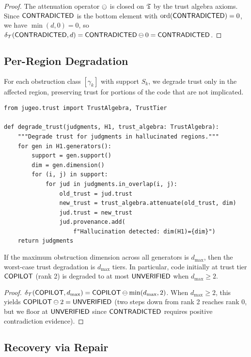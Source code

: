 \documentclass[11pt]{article}
\newcommand{\DegradeFn}{\delta_\trust}
\begin{document}
\begin{proof}
The attenuation operator $\ominus$ is closed on $\mathfrak{T}$ by the
trust algebra axioms.  Since $\mathsf{CONTRADICTED}$ is the bottom element with
$\mathrm{ord}(\mathsf{CONTRADICTED}) = 0$, we have $\min(d, 0) = 0$, so
$\DegradeFn(\Tcontra, d) = \Tcontra \tatten 0 = \Tcontra$.
\end{proof}


\subsection{Per-Region Degradation}

For each obstruction class $[\gamma_k]$ with support $S_k$, we
degrade trust only in the affected region, preserving trust for
portions of the code that are not implicated.

\begin{lstlisting}
from jugeo.trust import TrustAlgebra, TrustTier

def degrade_trust(judgments, H1, trust_algebra: TrustAlgebra):
    """Degrade trust for judgments in hallucinated regions."""
    for gen in H1.generators():
        support = gen.support()
        dim = gen.dimension()
        for (i, j) in support:
            for jud in judgments.in_overlap(i, j):
                old_trust = jud.trust
                new_trust = trust_algebra.attenuate(old_trust, dim)
                jud.trust = new_trust
                jud.provenance.add(
                    f"Hallucination detected: dim(H1)={dim}")
    return judgments
\end{lstlisting}

\begin{corollary}\label{cor:degrade-bound}
If the maximum obstruction dimension across all generators is $d_{\max}$,
then the worst-case trust degradation is $d_{\max}$ tiers.  In
particular, code initially at trust tier $\mathsf{COPILOT}$ (rank 2) is
degraded to at most $\mathsf{UNVERIFIED}$ when $d_{\max} \geq 2$.
\end{corollary}

\begin{proof}
$\DegradeFn(\Tcopilot, d_{\max}) = \Tcopilot \tatten \min(d_{\max}, 2)$.
When $d_{\max} \geq 2$, this yields $\mathsf{COPILOT} \ominus 2 = \mathsf{UNVERIFIED}$
(two steps down from rank 2 reaches rank 0, but we floor at $\mathsf{UNVERIFIED}$
since $\mathsf{CONTRADICTED}$ requires positive contradiction evidence).
\end{proof}


\subsection{Recovery via Repair}
\end{document}
